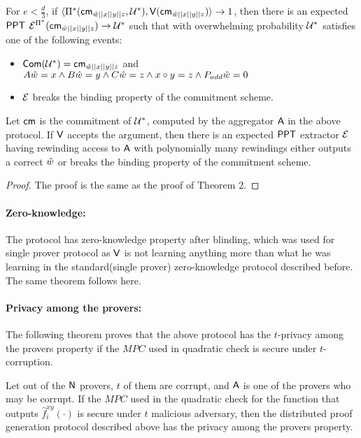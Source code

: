 \begin{theorem}
	For $e < \frac{d}{3}$, if $\langle \Pi^*(\mathsf{cm}_{\hat{w}||x||y||z}, \mathcal{U}^*),\mathsf{V}(\mathsf{cm}_{\hat{w}||x||y||z})\rangle \rightarrow 1$, then there is an expected $\mathsf{PPT}$ $\mathcal{E}^{\Pi^*}(\mathsf{cm}_{\hat{w}||x||y||z}) \rightarrow \mathcal{U}^*$ such that with overwhelming probability $\mathcal{U}^*$ satisfies one of the following events:
	\begin{itemize}
		\item $\mathsf{Com}(\mathcal{U}^*)=\mathsf{cm}_{\hat{w}||x||y||z}$ and $A\hat{w} = x \wedge B \hat{w} = y \wedge C \hat{w} = z \wedge x\circ y =z \wedge P_{add} \hat{w} = 0$
		\item $\mathcal{E}$ breaks the binding property of the commitment scheme.
		
	\end{itemize}
	Let $\mathsf{cm}$ is the commitment of $\mathcal{U}^*$, computed by the aggregator $\mathsf{A}$ in the above protocol. If $\mathsf{V}$ accepts the argument, then there is an expected $\mathsf{PPT}$ extractor $\mathcal{E}$ having rewinding access to $\mathsf{A}$ with polynomially many rewindings either outputs a correct $\hat{w}$ or breaks the binding property of the commitment scheme.
\end{theorem}

\begin{proof}
	The proof is the same as the proof of Theorem 2.
\end{proof}

\paragraph{Zero-knowledge: } The protocol has zero-knowledge property after blinding, which was used for single prover protocol as $\mathsf{V}$ is not learning anything more than what he was learning in the standard(single prover) zero-knowledge protocol described before. The same theorem follows here.

\paragraph{Privacy among the provers: } The following theorem proves that the above protocol has the $t$-privacy among the provers property if the $MPC$ used in quadratic check is secure under $t$-corruption.

\begin{theorem}
	Let out of the $\mathsf{N}$ provers, $t$ of them are corrupt, and $\mathsf{A}$ is one of the provers who may be corrupt. If the $MPC$ used in the quadratic check for the function that outputs $\hat{f}^{xy}_i(\cdot)$ is secure under $t$ malicious adversary, then the distributed proof generation protocol described above has the privacy among the provers property. 
\end{theorem} 

